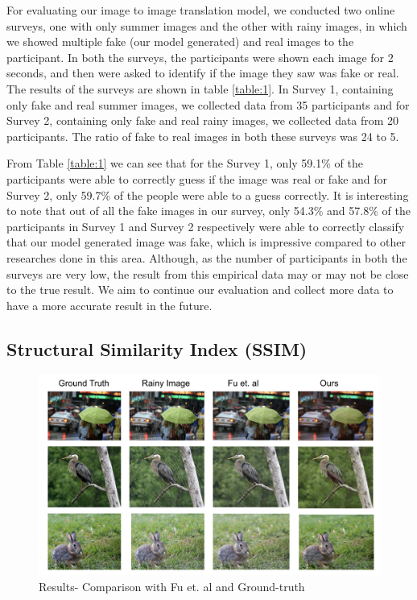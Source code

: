 \documentclass{article}
\begin{document}
For evaluating our image to image translation model, we conducted two online surveys, one with only summer images and the other with rainy images, in which we showed multiple fake (our model generated) and real images to the participant. In both the surveys, the participants were shown each image for 2 seconds, and then were asked to identify if the image they saw was fake or real. The results of the surveys are shown in table \ref{table:1}. In Survey 1, containing only fake and real summer images, we collected data from 35 participants and for Survey 2, containing only fake and real rainy images, we collected data from 20 participants. The ratio of fake to real images in both these surveys was 24 to 5. 

From Table \ref{table:1} we can see that for the Survey 1, only 59.1\% of the participants were able to correctly guess if the image was real or fake and for Survey 2, only 59.7\% of the people were able to a guess correctly. It is interesting to note that out of all the fake images in our survey, only 54.3\% and 57.8\% of the participants in Survey 1 and  Survey 2 respectively were able to correctly classify that our model generated image was fake, which is impressive compared to other researches done in this area. Although, as the number of participants in both the surveys are very low, the result from this empirical data may or may not be close to the true result. We aim to continue our evaluation and collect more data to have a more accurate result in the future.

\subsection{Structural Similarity Index (SSIM)}


\begin{figure}[H]
	\centering
	\includegraphics[width=\linewidth]{images/ssim.png}
	\caption{Results- Comparison with Fu et. al and Ground-truth}
	\label{figure:2}
\end{figure}
\end{document}
